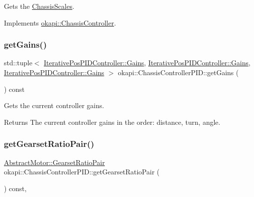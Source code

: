 Gets the \mbox{\hyperlink{classokapi_1_1ChassisScales}{Chassis\+Scales}}. 

Implements \mbox{\hyperlink{classokapi_1_1ChassisController_a0a8e32fc7adad8567f550954505aaa06}{okapi\+::\+Chassis\+Controller}}.

\mbox{\label{classokapi_1_1ChassisControllerPID_ae158a6b789d5a8ce97391d7251ee936a}} 
\subsubsection{\texorpdfstring{getGains()}{getGains()}}
{\footnotesize\ttfamily std\+::tuple$<$ \mbox{\hyperlink{structokapi_1_1IterativePosPIDController_1_1Gains}{Iterative\+Pos\+P\+I\+D\+Controller\+::\+Gains}}, \mbox{\hyperlink{structokapi_1_1IterativePosPIDController_1_1Gains}{Iterative\+Pos\+P\+I\+D\+Controller\+::\+Gains}}, \mbox{\hyperlink{structokapi_1_1IterativePosPIDController_1_1Gains}{Iterative\+Pos\+P\+I\+D\+Controller\+::\+Gains}} $>$ okapi\+::\+Chassis\+Controller\+P\+I\+D\+::get\+Gains (\begin{DoxyParamCaption}{ }\end{DoxyParamCaption}) const}

Gets the current controller gains.

\begin{DoxyReturn}{Returns}
The current controller gains in the order\+: distance, turn, angle. 
\end{DoxyReturn}
\mbox{\label{classokapi_1_1ChassisControllerPID_a50673f2911c969e2f6e89b02a29ce582}} 
\subsubsection{\texorpdfstring{getGearsetRatioPair()}{getGearsetRatioPair()}}
{\footnotesize\ttfamily \mbox{\hyperlink{structokapi_1_1AbstractMotor_1_1GearsetRatioPair}{Abstract\+Motor\+::\+Gearset\+Ratio\+Pair}} okapi\+::\+Chassis\+Controller\+P\+I\+D\+::get\+Gearset\+Ratio\+Pair (\begin{DoxyParamCaption}{ }\end{DoxyParamCaption}) const\hspace{0.3cm}{\ttfamily [override]}, {\ttfamily [virtual]}}

